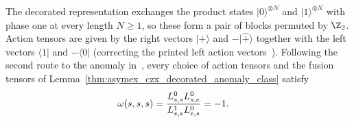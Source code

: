 \begin{lemma}
    \label{thm:asymex_czx_product_state_l_symbols}
    \leanok
    The decorated representation exchanges the product states
    $|0\rangle^{\otimes N}$ and $|1\rangle^{\otimes N}$ with phase one at every
    length $N\geq1$, so these form a pair of blocks permuted by $\Z_2$.
    Action tensors are given by the right vectors $|\hat +\rangle$ and
    $-|\hat +\rangle$ together with the left vectors $\langle1|$ and
    $-\langle0|$ (correcting the printed left action
    vectors~\cite{gap:gs24_czx_action_left_vectors}). Following the
    second route to the anomaly
    in~\cite[lines~1246--1339]{GarreRubioSchuch2024DomainWall}, every
    choice of action tensors and the fusion tensors of
    Lemma~\ref{thm:asymex_czx_decorated_anomaly_class} satisfy
    \begin{align}
        \omega(s,s,s)
         & =\frac{L^0_{s,s}L^0_{s,e}}{L^1_{s,s}L^0_{e,s}}=-1.
        \notag
    \end{align}
\end{lemma}

